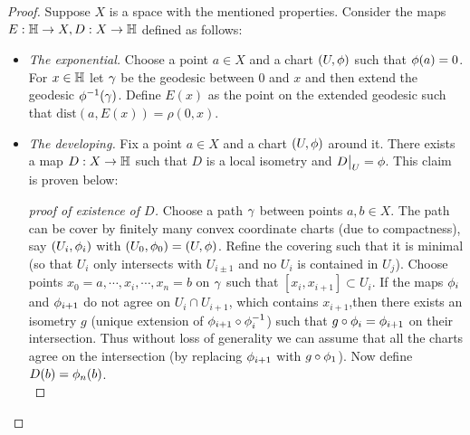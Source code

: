\begin{proof}
  Suppose $X$ is a space with the mentioned properties. Consider the maps $E:\mathbb{H}\to X,D:X\to \mathbb{H}$ defined as follows:
  \begin{itemize}
    \item \textit{The exponential.} Choose a point $a\in X$ and a chart $(U, \phi)$ such that $\phi(a) = 0$. For $x\in \mathbb{H}$ let $\gamma$ be the geodesic between $0$ and $x$ and then extend the geodesic $\phi^{-1}(\gamma)$. Define $E(x)$ as the point on the extended geodesic such that $\text{dist}(a,E(x)) = \rho(0,x)$.
    \item \textit{The developing.} Fix a point $a\in X$ and a chart $(U,\phi)$ around it. There exists a map $D:X\to \mathbb{H}$ such that $D$ is a local isometry and $D\big|_U = \phi$. This claim is proven below:
      \begin{proof}[proof of existence of $D$]
        Choose a path $\gamma$ between points $a,b\in X$. The path can be cover by finitely many convex coordinate charts (due to compactness), say $(U_i,\phi_i)$ with $(U_0, \phi_0) = (U,\phi)$. Refine the covering such that it is minimal (so that $U_i$ only intersects with $U_{i\pm 1}$ and no $U_i$ is contained in $U_j$). Choose points $x_0=a,\cdots,x_i,\cdots,x_n=b$ on $\gamma$ such that $[x_i,x_{i+1}]\subset U_i$. If the maps $\phi_i$ and $\phi_{i+1}$ do not agree on $U_i\cap U_{i+1}$, which contains $x_{i+1}$,then there exists an isometry $g$ (unique extension of $\phi_{i+1}\circ\phi_{i}^{-1}$) such that $g\circ\phi_i = \phi_{i+1}$ on their intersection. Thus without loss of generality we can assume that all the charts agree on the intersection (by replacing $\phi_{i+1}$ with $g\circ \phi_1$). Now define $D(b) = \phi_n(b)$.\\


\end{proof}
\end{itemize}
\end{proof}
